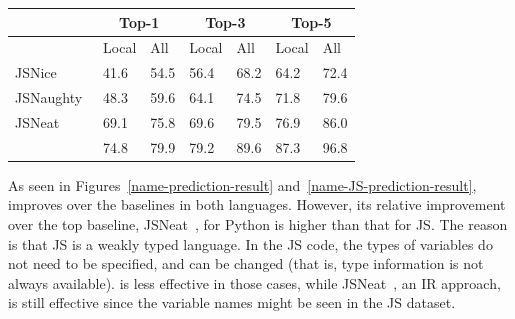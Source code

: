 {{\begin{table}[t]
\begin{center}
\begin{tabular}{|p{1.9cm}<{\centering}|p{0.65cm}<{\centering}|p{0.65cm}<{\centering}|p{0.65cm}<{\centering}|p{0.65cm}<{\centering}|p{0.65cm}<{\centering}|p{0.65cm}<{\centering}|}
			\hline
                       & \multicolumn{2}{c|}{Top-1}         & \multicolumn{2}{c|}{Top-3}         & \multicolumn{2}{c|}{Top-5} \\
			\hline
                       & Local & All & Local & All & Local & All  \\ 
			\hline
		        JSNice~\cite{JSNice2015} &  41.6    & 54.5  & 56.4 &    68.2   & 64.2      &   72.4    \\
			JSNaughty~\cite{JSNaughty2017}  &   48.3   &  59.6    &  64.1    &  74.5    &  71.8    &   79.6    \\
			JSNeat~\cite{icse19}  &   69.1   &  75.8    &  69.6    & 79.5     &  76.9    & 86.0     \\
			\hline
			{\bf {\tool}} & 74.8 & 79.9 & 79.2 & 89.6 & 87.3 & 96.8 \\
			\hline
		\end{tabular}
		\label{name-JS-result}
	\end{center}
\end{table}

As seen in Figures~\ref{name-prediction-result}
and~\ref{name-JS-prediction-result}, {\tool} improves over the
baselines in both languages. However, its relative improvement over
the top baseline, JSNeat~\cite{icse19}, for Python is higher than that
for JS. The reason is that JS is a weakly typed language. In the JS
code, the types of variables do not need to be specified, and can be
changed (that is, type information is not always available). {\tool}
is less effective in those cases, while JSNeat~\cite{icse19}, an IR
approach, is still effective since the variable names might be seen in
the JS dataset.



}}

